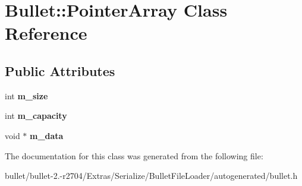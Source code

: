 \hypertarget{class_bullet_1_1_pointer_array}{\section{Bullet\+:\+:Pointer\+Array Class Reference}
\label{class_bullet_1_1_pointer_array}
}
\subsection*{Public Attributes}
\begin{DoxyCompactItemize}
\item 
\hypertarget{class_bullet_1_1_pointer_array_a52b5e4f732959aab4bc7dfdc260ab10f}{int {\bfseries m\+\_\+size}}\label{class_bullet_1_1_pointer_array_a52b5e4f732959aab4bc7dfdc260ab10f}

\item 
\hypertarget{class_bullet_1_1_pointer_array_af656efec24eddd884cfa8964892d9ae5}{int {\bfseries m\+\_\+capacity}}\label{class_bullet_1_1_pointer_array_af656efec24eddd884cfa8964892d9ae5}

\item 
\hypertarget{class_bullet_1_1_pointer_array_ac2bfa3a7de472d2044efa9286dbdef64}{void $\ast$ {\bfseries m\+\_\+data}}\label{class_bullet_1_1_pointer_array_ac2bfa3a7de472d2044efa9286dbdef64}

\end{DoxyCompactItemize}


The documentation for this class was generated from the following file\+:\begin{DoxyCompactItemize}
\item 
bullet/bullet-\/2.-\/r2704/\+Extras/\+Serialize/\+Bullet\+File\+Loader/autogenerated/bullet.\+h\end{DoxyCompactItemize}
